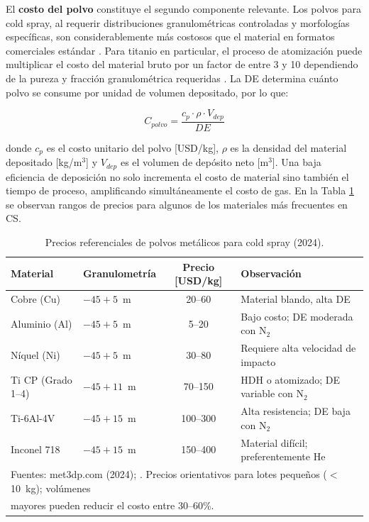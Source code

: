 El \textbf{costo del polvo} constituye el segundo componente relevante. Los 
polvos para cold spray, al requerir distribuciones granulométricas controladas 
y morfologías específicas, son considerablemente más costosos que el material 
en formatos comerciales estándar \cite{Stier2014}. Para titanio en particular, el proceso de 
atomización puede multiplicar el costo del material bruto por un factor de 
entre 3 y 10 dependiendo de la pureza y fracción granulométrica requeridas 
\cite{Champagne2016unique}. La DE determina cuánto 
polvo se consume por unidad de volumen depositado, por lo que:

\begin{equation}
	C_{polvo} = \frac{c_p \cdot \rho \cdot V_{dep}}{DE}
	\label{eq:costo_polvo}
\end{equation}

donde $c_p$ es el costo unitario del polvo [USD/kg], $\rho$ es la densidad 
del material depositado [kg/m$^3$] y $V_{dep}$ es el volumen de depósito neto 
[m$^3$]. Una baja eficiencia de deposición no solo incrementa el costo de 
material sino también el tiempo de proceso, amplificando simultáneamente el 
costo de gas. En la Tabla \ref{tab:precios_polvos} se observan rangos de precios para algunos de los materiales más frecuentes en CS.

\begin{table}[h]
	\centering
	\caption{Precios referenciales de polvos metálicos para cold spray (2024).}
	\label{tab:precios_polvos}
	\begin{tabular}{llcp{5cm}}
		\hline
		\textbf{Material} & \textbf{Granulometría} & 
		\textbf{Precio [USD/kg]} & \textbf{Observación} \\
		\hline
		Cobre (Cu)          & $-45{+}5$~\textmu m   & 20--60    & 
		Material blando, alta DE \\
		Aluminio (Al)       & $-45{+}5$~\textmu m   & 5--20     & 
		Bajo costo; DE moderada con N$_2$ \\
		Níquel (Ni)         & $-45{+}5$~\textmu m   & 30--80    & 
		Requiere alta velocidad de impacto \\
		Ti CP (Grado 1--4)  & $-45{+}11$~\textmu m  & 70--150   & 
		HDH o atomizado; DE variable con N$_2$ \\
		Ti-6Al-4V           & $-45{+}15$~\textmu m  & 100--300  & 
		Alta resistencia; DE baja con N$_2$ \\
		Inconel 718         & $-45{+}15$~\textmu m  & 150--400  & 
		Material difícil; preferentemente He \\
		\hline
		\multicolumn{4}{l}{\footnotesize Fuentes: met3dp.com (2024); 
			\cite{Helfritch2015economics}. Precios orientativos para lotes pequeños 
			($<$10~kg); volúmenes} \\
		\multicolumn{4}{l}{\footnotesize mayores pueden reducir el costo entre 
			30--60\%.} \\
	\end{tabular}
\end{table}

